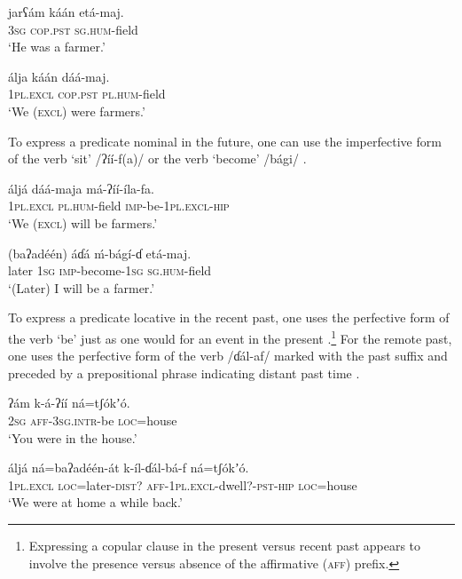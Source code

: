 \documentclass[output=paper]{langsci/langscibook}
\begin{document}
\ea\label{ex:ahlandc:75}
\gll
jarʕám  káán  etá-maj.  \\
\textsc{3sg}    \textsc{cop.pst}  \textsc{sg.hum}{}-field\\
\glt
‘He was a farmer.’
\z

\ea\label{ex:ahlandc:76}
\gll
álja    káán    dáá-maj.\\
\textsc{1pl.excl}   \textsc{cop.pst}    \textsc{pl.hum}{}-field\\
\glt
‘We (\textsc{excl}) were farmers.’
\z

To express a predicate nominal in the future, one can use the imperfective form of the verb ‘sit’ /ʔíí-f(a)/  or the verb ‘become’ /bági/ .

\ea\label{ex:ahlandc:77}
\gll
áljá      dáá-maja  má-ʔíí-íla-fa.\\
\textsc{1pl.excl}    \textsc{pl.hum}{}-field   \textsc{imp}{}-be-\textsc{1pl.excl-hip}\\
\glt
‘We (\textsc{excl}) will be farmers.’
\z

\ea\label{ex:ahlandc:78}
\gll
(baʔadéén) áɗá          \'{m}-bágí-ɗ     etá-maj. \\
later           \textsc{1sg}   \textsc{imp}{}-become-\textsc{1sg}   \textsc{sg.hum}{}-field\\
 \glt
 ‘(Later) I will be a farmer.’  
\z

To express a predicate locative in the recent past, one uses the perfective form of the verb ‘be’ just as one would for an event in the present .\footnote{Expressing a copular clause in the present versus recent past appears to involve the presence versus absence of the affirmative (\textsc{aff}) prefix.} For the remote past, one uses the perfective form of the verb /ɗál-af/ marked with the past suffix and preceded by a prepositional phrase indicating distant past time .

\ea\label{ex:ahlandc:79}
\gll
ʔám         k-á-ʔíí                    ná=tʃ\'{o}kʼ\'{o}.\\
\textsc{2sg}   \textsc{aff-3sg.intr}{}-be  \textsc{loc}=house\\
\glt
‘You were in the house.’
\z

\ea\label{ex:ahlandc:80}
\gll
áljá    ná=baʔadéén-át  k-íl-ɗál-bá-f       ná=tʃ\'{o}kʼ\'{o}.\\
\textsc{1pl.excl}   \textsc{loc}=later-\textsc{dist?}      \textsc{aff-1pl.excl}{}-dwell?-\textsc{pst-hip}  \textsc{loc}=house\\
\glt
‘We were at home a while back.’
\z
\end{document}
